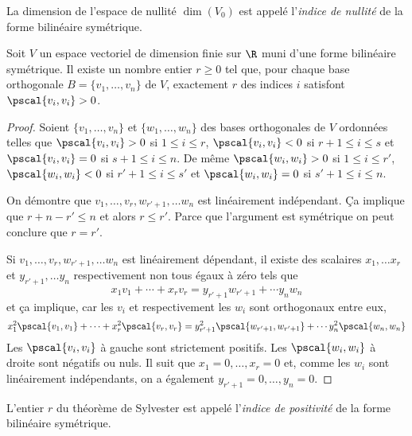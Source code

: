 \begin{definition}
  La dimension de l'espace de nullité $\dim(V_0)$ est appelé l'\emph{indice de nullité} de la forme bilinéaire symétrique. 
\end{definition}

\begin{theorem} 
\label{thr:10}
Soit $V$
un espace vectoriel de dimension finie sur $\R$
muni d'une forme bilinéaire symétrique.
Il existe un nombre entier $r ≥0$ tel que, pour chaque base orthogonale 
  $B = \{v_1,\dots,v_n\}$ de $V$, 
 exactement $r$ des indices $i$ satisfont $\pscal{v_i,v_i}>0$.
\end{theorem}


\begin{proof}
  Soient $\{v_1,\dots,v_n\}$
  et $\{w_1,\dots,w_n\}$ des
  bases orthogonales de $V$ ordonnées 
  telles que $\pscal{v_i,v_i} >0 $
  si $1 \leq i \leq r$,
  $\pscal{v_i,v_i} <0 $
  si $r+1 \leq i \leq s$
  et $\pscal{v_i,v_i} =0 $
  si $s+1 \leq i \leq n$.
  De même $\pscal{w_i,w_i} >0 $
  si $1 \leq i \leq r'$,
  $\pscal{w_i,w_i} <0 $
  si $r'+1 \leq i \leq s'$
  et $\pscal{w_i,w_i} =0 $ si $s'+1 \leq i \leq n$.



  On démontre que $v_1,\dots,v_r,w_{r'+1},\dots w_n$
  est linéairement indépendant. Ça implique que $r + n-r' \leq n$
  et alors $r \leq r'$.
  Parce que l'argument est symétrique on peut conclure que $r = r'$.

  Si $v_1,\dots,v_r,w_{r'+1},\dots w_n$ est linéairement dépendant, il existe des scalaires $x_1,\dots x_r$ et $y_{r'+1},\dots y_n$ respectivement  non tous égaux à zéro tels que 
  \begin{displaymath}
    x_1 v_1 + \cdots + x_r v_r = y_{r'+1} w_{r'+1} + \cdots y_n w_n 
  \end{displaymath}
et ça implique, car les $v_i$ et respectivement les $w_i$  sont orthogonaux entre eux, 
\begin{displaymath}
   x_1^2\pscal{v_1,v_1} + \cdots + x_r^2 \pscal{v_r,v_r} = y_{r'+1}^2 \pscal{w_{r'+1},w_{r'+1}} + \cdots y_n^2 \pscal{w_n,w_n} 
\end{displaymath}
Les $\pscal{v_i,v_i}$ à gauche sont strictement positifs. Les $\pscal{w_i,w_i} $ à droite sont négatifs ou nuls. Il suit que $x_1=0,\dots,x_r = 0$ et, comme les $w_i$ sont linéairement indépendants, on a également $y_{r'+1}=0,\dots,y_n=0$. 
\end{proof}


\begin{definition}
  \label{def:12}
  L'entier $r$ du théorème de Sylvester est appelé l'\emph{indice de positivité} de la forme bilinéaire symétrique. 
\end{definition}



